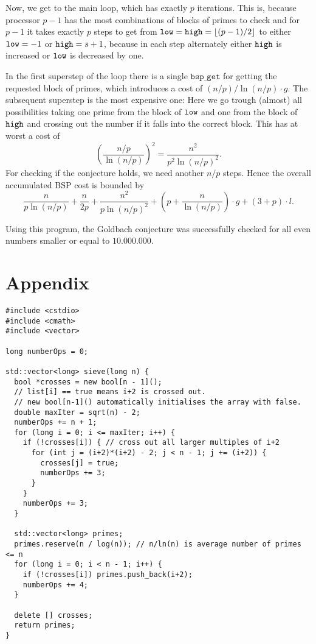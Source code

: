 \documentclass[a4paper,12pt]{article}
\DeclarePairedDelimiter\floor{\lfloor}{\rfloor}
\begin{document}
Now, we get to the main loop, which has exactly $p$ iterations.
This is, because processor $p-1$ has the most combinations of blocks of primes to check and for $p-1$ it takes exactly $p$ steps to get from $\low=\high=\floor{(p-1)/2}$ to either $\texttt{low} = -1$ or $\texttt{high} = s+1$, because in each step alternately either $\texttt{high}$ is increased or $\texttt{low}$ is decreased by one.

In the first superstep of the loop there is a single $\texttt{bsp}\_\texttt{get}$ for getting the requested block of primes,
which introduces a cost of $(n/p)/\ln(n/p) \cdot g$.
The subsequent superstep is the most expensive one:
Here we go trough (almost) all possibilities taking one prime from the block of $\texttt{low}$ and one from the block of $\texttt{high}$ and crossing out the number if it falls into the correct block.
This has at worst a cost of \[
\left(\frac{n/p}{\ln(n/p)}\right)^2 = \frac{n^2}{p^2 \ln(n/p)^2}.\]
For checking if the conjecture holds, we need another $n/p$ steps.
Hence the overall accumulated BSP cost is bounded by
\[
	\frac{n}{p \ln(n/p)} + \frac{n}{2p} + \frac{n^2}{p \ln(n/p)^2} + \left( p + \frac{n}{\ln(n/p)} \right)\cdot g + (3+p)\cdot l.
\]



Using this program, the Goldbach conjecture was successfully checked for all even numbers smaller or equal to $10.000.000$.

\pagebreak
\appendix
\section{Appendix}

 	\begin{lstlisting}[caption={Sequential implementation of the Sieve of Eratosthenes}, label={prg:seq_sieve}, frame={single}]
#include <cstdio>
#include <cmath>
#include <vector>

long numberOps = 0;

std::vector<long> sieve(long n) {
  bool *crosses = new bool[n - 1]();
  // list[i] == true means i+2 is crossed out.
  // new bool[n-1]() automatically initialises the array with false.
  double maxIter = sqrt(n) - 2;
  numberOps += n + 1;
  for (long i = 0; i <= maxIter; i++) {
    if (!crosses[i]) { // cross out all larger multiples of i+2
      for (int j = (i+2)*(i+2) - 2; j < n - 1; j += (i+2)) {
        crosses[j] = true;
        numberOps += 3;
      }
    }
    numberOps += 3;
  }

  std::vector<long> primes;
  primes.reserve(n / log(n)); // n/ln(n) is average number of primes <= n
  for (long i = 0; i < n - 1; i++) {
    if (!crosses[i]) primes.push_back(i+2);
    numberOps += 4;
  }

  delete [] crosses;
  return primes;
}
	\end{lstlisting}
\end{document}
